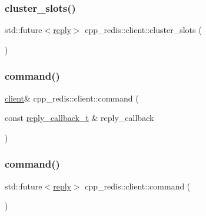 \mbox{\label{classcpp__redis_1_1client_a9dc222141ab85da05efbce7a7ff0a7d1}} 
\subsubsection{\texorpdfstring{cluster\+\_\+slots()}{cluster\_slots()}\hspace{0.1cm}{\footnotesize\ttfamily [2/2]}}
{\footnotesize\ttfamily std\+::future$<$\hyperlink{classcpp__redis_1_1reply}{reply}$>$ cpp\+\_\+redis\+::client\+::cluster\+\_\+slots (\begin{DoxyParamCaption}{ }\end{DoxyParamCaption})}

\mbox{\label{classcpp__redis_1_1client_accac4fab4be3f71b94fc0aa02496f6a3}} 
\subsubsection{\texorpdfstring{command()}{command()}\hspace{0.1cm}{\footnotesize\ttfamily [1/2]}}
{\footnotesize\ttfamily \hyperlink{classcpp__redis_1_1client}{client}\& cpp\+\_\+redis\+::client\+::command (\begin{DoxyParamCaption}\item[{const \hyperlink{classcpp__redis_1_1client_a061a1140d36d2eaeda82b09a0bb3f9f2}{reply\+\_\+callback\+\_\+t} \&}]{reply\+\_\+callback }\end{DoxyParamCaption})}

\mbox{\label{classcpp__redis_1_1client_a93ef2e84647990d02aa67a1e22341b38}} 
\subsubsection{\texorpdfstring{command()}{command()}\hspace{0.1cm}{\footnotesize\ttfamily [2/2]}}
{\footnotesize\ttfamily std\+::future$<$\hyperlink{classcpp__redis_1_1reply}{reply}$>$ cpp\+\_\+redis\+::client\+::command (\begin{DoxyParamCaption}{ }\end{DoxyParamCaption})}

